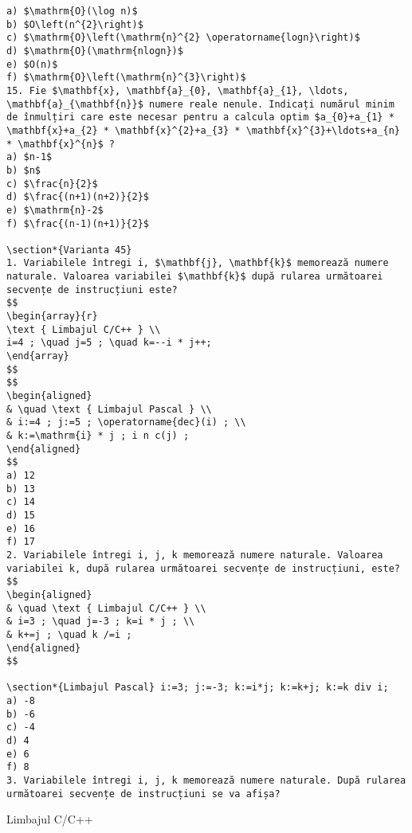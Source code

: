 \begin{verbatim}
a) $\mathrm{O}(\log n)$
b) $O\left(n^{2}\right)$
c) $\mathrm{O}\left(\mathrm{n}^{2} \operatorname{logn}\right)$
d) $\mathrm{O}(\mathrm{nlogn})$
e) $O(n)$
f) $\mathrm{O}\left(\mathrm{n}^{3}\right)$
15. Fie $\mathbf{x}, \mathbf{a}_{0}, \mathbf{a}_{1}, \ldots, \mathbf{a}_{\mathbf{n}}$ numere reale nenule. Indicați numărul minim de înmulțiri care este necesar pentru a calcula optim $a_{0}+a_{1} * \mathbf{x}+a_{2} * \mathbf{x}^{2}+a_{3} * \mathbf{x}^{3}+\ldots+a_{n} * \mathbf{x}^{n}$ ?
a) $n-1$
b) $n$
c) $\frac{n}{2}$
d) $\frac{(n+1)(n+2)}{2}$
e) $\mathrm{n}-2$
f) $\frac{(n-1)(n+1)}{2}$

\section*{Varianta 45}
1. Variabilele întregi i, $\mathbf{j}, \mathbf{k}$ memorează numere naturale. Valoarea variabilei $\mathbf{k}$ după rularea următoarei secvențe de instrucțiuni este?
$$
\begin{array}{r}
\text { Limbajul C/C++ } \\
i=4 ; \quad j=5 ; \quad k=--i * j++;
\end{array}
$$
$$
\begin{aligned}
& \quad \text { Limbajul Pascal } \\
& i:=4 ; j:=5 ; \operatorname{dec}(i) ; \\
& k:=\mathrm{i} * j ; i n c(j) ;
\end{aligned}
$$
a) 12
b) 13
c) 14
d) 15
e) 16
f) 17
2. Variabilele întregi i, j, k memorează numere naturale. Valoarea variabilei k, după rularea următoarei secvențe de instrucțiuni, este?
$$
\begin{aligned}
& \quad \text { Limbajul C/C++ } \\
& i=3 ; \quad j=-3 ; k=i * j ; \\
& k+=j ; \quad k /=i ;
\end{aligned}
$$

\section*{Limbajul Pascal} i:=3; j:=-3; k:=i*j; k:=k+j; k:=k div i;
a) -8
b) -6
c) -4
d) 4
e) 6
f) 8
3. Variabilele întregi i, j, k memorează numere naturale. După rularea următoarei secvențe de instrucțiuni se va afișa?
\end{verbatim}

Limbajul C/C++

